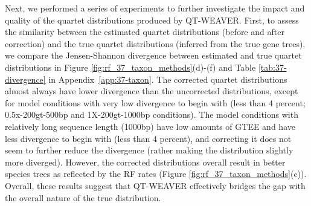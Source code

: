 \documentclass[10pt,a4paper]{article}
\newcommand{\addb}[1]{{\color{red} #1}}
\begin{document}
Next, we performed a series of experiments to further investigate the impact and quality of the quartet distributions produced by QT-WEAVER. First, to assess the similarity between the estimated quartet distributions (before and after correction) and the true quartet distributions (inferred from the true gene trees), we compare the Jensen-Shannon divergence between estimated and true quartet distributions in Figure \ref{fig:rf_37_taxon_methods}(d)-(f) and Table \ref{tab:37-divergence} in Appendix~\ref{app:37-taxon}. The corrected quartet distributions almost always have lower divergence than the uncorrected distributions, except for model conditions with very low divergence to begin with (less than 4 percent; 0.5x-200gt-500bp and 1X-200gt-1000bp conditions). The model conditions with relatively long sequence length (1000bp) have low amounts of GTEE and have less divergence to begin with (less than 4 percent), and correcting it does not seem to further reduce the divergence (rather making the distribution slightly more diverged). However, the corrected distributions overall result in better species trees as reflected by the RF rates (Figure \ref{fig:rf_37_taxon_methods}(c)). %
Overall, these results suggest that QT-WEAVER effectively bridges the gap with the overall nature of the true distribution. %



\end{document}
